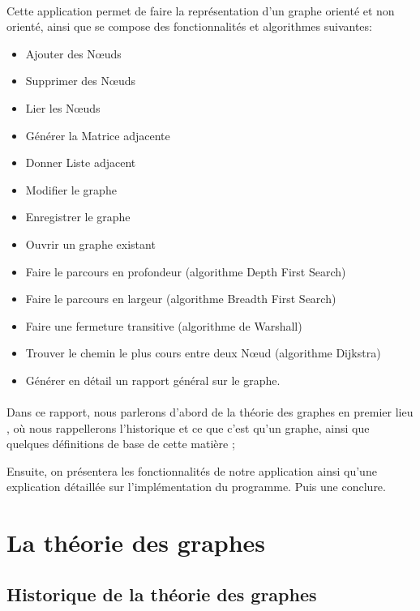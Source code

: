 \documentclass[11pt,twoside,a4paper]{article}
\begin{document}
\paragraph{}
Cette application permet de faire la représentation d'un graphe orienté et non orienté, ainsi que se compose des fonctionnalités et algorithmes suivantes:
\begin{itemize}
	\item Ajouter des Nœuds
	\item  Supprimer des Nœuds
	\item Lier les Nœuds
	\item Générer la Matrice adjacente
	\item Donner Liste adjacent
	\item Modifier le graphe
	\item Enregistrer le graphe
	\item Ouvrir un graphe existant
	\item Faire le parcours en profondeur (algorithme  Depth First Search)
	\item Faire le parcours en largeur (algorithme Breadth First Search)
	\item Faire une fermeture transitive (algorithme de Warshall)
	\item Trouver le chemin le plus cours entre deux Nœud (algorithme Dijkstra)
	\item Générer en détail un rapport général sur le graphe.
 \end{itemize}
\paragraph{}
Dans ce rapport, nous parlerons d’abord de la théorie des graphes en premier lieu , où nous rappellerons l’historique et ce que c’est qu’un graphe, ainsi que quelques définitions de base de cette matière ;

 Ensuite, on présentera les fonctionnalités de notre application ainsi qu’une explication détaillée sur l'implémentation du programme. Puis une conclure.

\newpage
\section{La théorie des graphes }

\subsection{Historique de la théorie des graphes}
\end{document}
